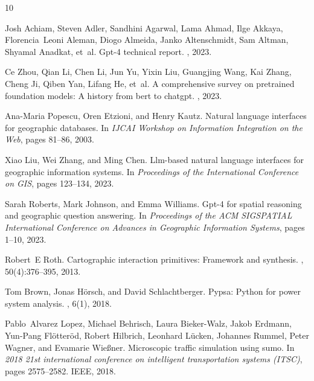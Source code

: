 \documentclass[sigconf]{acmart}
\begin{document}


\begin{thebibliography}{10}

Josh Achiam, Steven Adler, Sandhini Agarwal, Lama Ahmad, Ilge Akkaya, Florencia~Leoni Aleman, Diogo Almeida, Janko Altenschmidt, Sam Altman, Shyamal Anadkat, et~al.
\newblock Gpt-4 technical report.
, 2023.

Ce Zhou, Qian Li, Chen Li, Jun Yu, Yixin Liu, Guangjing Wang, Kai Zhang, Cheng Ji, Qiben Yan, Lifang He, et~al.
\newblock A comprehensive survey on pretrained foundation models: A history from bert to chatgpt.
, 2023.

Ana-Maria Popescu, Oren Etzioni, and Henry Kautz.
\newblock Natural language interfaces for geographic databases.
\newblock In {\em IJCAI Workshop on Information Integration on the Web}, pages 81--86, 2003.

Xiao Liu, Wei Zhang, and Ming Chen.
\newblock Llm-based natural language interfaces for geographic information systems.
\newblock In {\em Proceedings of the International Conference on GIS}, pages 123--134, 2023.

Sarah Roberts, Mark Johnson, and Emma Williams.
\newblock Gpt-4 for spatial reasoning and geographic question answering.
\newblock In {\em Proceedings of the ACM SIGSPATIAL International Conference on Advances in Geographic Information Systems}, pages 1--10, 2023.

Robert~E Roth.
\newblock Cartographic interaction primitives: Framework and synthesis.
, 50(4):376--395, 2013.

Tom Brown, Jonas H{\"o}rsch, and David Schlachtberger.
\newblock Pypsa: Python for power system analysis.
, 6(1), 2018.

Pablo~Alvarez Lopez, Michael Behrisch, Laura Bieker-Walz, Jakob Erdmann, Yun-Pang Fl{\"o}tter{\"o}d, Robert Hilbrich, Leonhard L{\"u}cken, Johannes Rummel, Peter Wagner, and Evamarie Wie{\ss}ner.
\newblock Microscopic traffic simulation using sumo.
\newblock In {\em 2018 21st international conference on intelligent transportation systems (ITSC)}, pages 2575--2582. IEEE, 2018.

\end{thebibliography}
\end{document}
